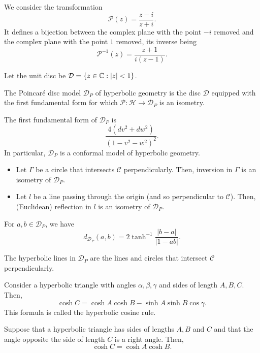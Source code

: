 We consider the transformation
\[
  \mathcal{P}(z) = \frac{z - i}{z + i}.
\]
It defines a bijection between the complex plane with the point $-i$ removed
and the complex plane with the point $1$ removed, its inverse being
\[
  \mathcal{P}^{-1}(z) = \frac{z + 1}{i(z - 1)}.
\]

Let the unit disc be $\mathcal{D} = \{z \in \mathbb{C} : |z| < 1\}$.

\begin{defn}
  The Poincar\'e disc model $\mathcal{D}_P$ of hyperbolic geometry is the disc $\mathcal{D}$
  equipped with the first fundamental form for which $\mathcal{P}: \mathcal{H} \to \mathcal{D}_P$
  is an isometry.
\end{defn}

\begin{proposition}
  The first fundamental form of $\mathcal{D}_P$ is
  \[
    \frac{4(dv^2 + dw^2)}{(1 - v^2 - w^2)^2}.
  \]
  In particular, $\mathcal{D}_P$ is a conformal model of hyperbolic geometry.
\end{proposition}

\begin{proposition}
  \begin{itemize}
    \item Let $\Gamma$ be a circle that intersects $\mathcal{C}$ perpendicularly.
    Then, inversion in $\Gamma$ is an isometry of $\mathcal{D}_P$.
    \item Let $l$ be a line passing through the origin (and so perpendicular to $\mathcal{C}$).
    Then, (Euclidean) reflection in $l$ is an isometry of $\mathcal{D}_P$.
  \end{itemize}
\end{proposition}

\begin{proposition}
  For $a, b \in \mathcal{D}_P$, we have
  \[
    d_{\mathcal{D}_P}(a, b) = 2\tanh^{-1}\frac{|b - a|}{|1 - \overline{a}b|}.
  \]
\end{proposition}

\begin{proposition}
  The hyperbolic lines in $\mathcal{D}_P$ are the lines and circles that intersect
  $\mathcal{C}$ perpendicularly.
\end{proposition}

\begin{theorem}
  Consider a hyperbolic triangle with angles $\alpha, \beta, \gamma$ and sides of length
  $A, B, C$. Then,
  \[
    \cosh C = \cosh A \cosh B - \sinh A \sinh B \cos \gamma.  
  \]
  This formula is called the hyperbolic cosine rule.
\end{theorem}

\begin{corollary}
  Suppose that a hyperbolic triangle has sides of lengths $A, B$ and $C$ and that
  the angle opposite the side of length $C$ is a right angle. Then,
  \[
    \cosh C = \cosh A \cosh B.  
  \]
\end{corollary}